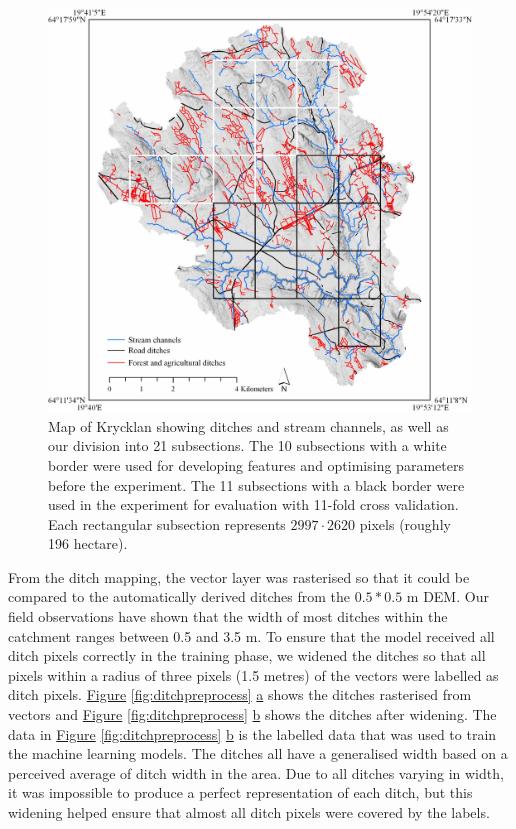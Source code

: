 \documentclass[11pt, review]{elsarticle} %
\begin{document}
\begin{figure}[!htb]
    \centering
    \includegraphics[width=1\linewidth]{./images/Krycklan_lo.jpg}
    \caption{Map of Krycklan showing ditches and stream channels, as well as our division into 21 subsections. The 10 subsections with a white border were used for developing features and optimising parameters before the experiment. The 11 subsections with a black border were used in the experiment for evaluation with 11-fold cross validation. Each rectangular subsection represents $2997 \cdot 2620$ pixels (roughly 196 hectare).}
    \label{fig:swedenkrycklan}
\end{figure}

From the ditch mapping, the vector layer was rasterised so that it could be compared to the automatically derived ditches from the $0.5*0.5$ m DEM. Our field observations have shown that the  width of most ditches within the catchment ranges between 0.5 and 3.5 m. To ensure that the model received all ditch pixels correctly in the training phase, we widened the ditches so that all pixels within a radius of three pixels (1.5 metres) of the vectors were labelled as ditch pixels. \hyperref[fig:ditchpreprocess]{Figure} \ref{fig:ditchpreprocess} \hyperref[fig:ditchpreprocess]{a} shows the ditches rasterised from vectors and \hyperref[fig:ditchpreprocess]{Figure} \ref{fig:ditchpreprocess} \hyperref[fig:ditchpreprocess]{b} shows the ditches after widening. The data in \hyperref[fig:ditchpreprocess]{Figure} \ref{fig:ditchpreprocess} \hyperref[fig:ditchpreprocess]{b} is the labelled data that was used to train the machine learning models. The ditches all have a generalised width based on a perceived average of ditch width in the area. Due to all ditches varying in width, it was impossible to produce a perfect representation of each ditch, but this widening helped ensure that almost all ditch pixels were covered by the labels.
\end{document}
